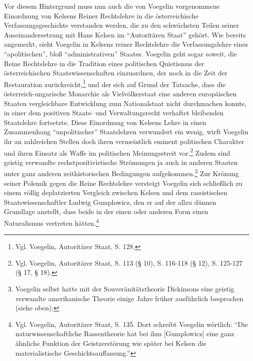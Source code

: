 \documentclass[12pt,a4paper,ngerman]{article}
\begin{document}
Vor diesem Hintergrund muss nun auch die von Voegelin vorgenommene Einordnung
von Kelsens Reiner Rechtslehre in die österreichische Verfassungsgeschichte
verstanden werden, die zu den schwächsten Teilen seiner Auseinandersetzung mit
Hans Kelsen im "`Autoritären Staat"' gehört. Wie bereits angemerkt, sieht
Voegelin in Kelsens reiner Rechtslehre die Verfassungslehre eines
"`apolitischen"', bloß "`administrativen"' Staates.  Voegelin geht sogar
soweit, die Reine Rechtslehre in die Tradition eines politischen Quietismus
der österreichischen Staatswissenschaften einzuordnen, der noch in die Zeit
der Restauration zurückreicht,\footnote{Vgl. Voegelin, Autoritärer Staat, S.
  128.}  und der sich auf Grund der Tatsache, dass die österreich-ungarische
Monarchie als Vielvölkerstaat eine anderen europäischen Staaten vergleichbare
Entwicklung zum Nationalstaat nicht durchmachen konnte, in einer dem positiven
Staats- und Verwaltungsrecht verhaftet bleibenden Staatslehre fortsetzte.
Diese Einordnung von Kelsens Lehre in einen Zusammenhang "`unpolitischer"'
Staatslehren verwundert ein wenig, wirft Voegelin ihr an zahlreichen Stellen
doch ihren vermeintlich eminent politischen Charakter und ihren Einsatz als
Waffe im politischen Meinungsstreit vor.\footnote{Vgl.  Voegelin, Autoritärer
  Staat, S.  113 (§ 10), S.  116-118 (§ 12), S.  125-127 (§ 17, § 18).} Zudem
sind geistig verwandte rechstpositivistische Strömungen ja auch in anderen
Staaten unter ganz anderen zeithistorischen Bedingungen
aufgekommen.\footnote{Voegelin selbst hatte mit der Souveränitätstheorie
  Dickinsons eine geistig verwandte amerikanische Theorie einige Jahre früher
  ausführlich besprochen (siehe oben).} Zur Krönung seiner Polemik gegen die
Reine Rechtslehre versteigt Voegelin sich schließlich zu einem völlig
deplatzierten Vergleich zwischen Kelsen und dem rassistischen
Staatswissenschaftler Ludwig Gumplowicz, den er auf der allzu dünnen Grundlage
anstellt, dass beide in der einen oder anderen Form einen Naturalismus
vertreten hätten.\footnote{Vgl.  Voegelin, Autoritärer Staat, S.  135.  Dort
  schreibt Voegelin wörtlich: "`Die naturwissenschaftliche Rassentheorie hat
  bei ihm [Gumplowicz] eine ganz ähnliche Funktion der Geistzerstörung wie
  später bei Kelsen die materialistische Geschichtsauffassung."'}
\end{document}
